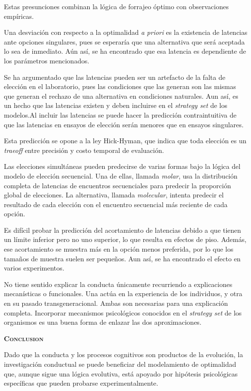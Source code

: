 \documentclass[a4paper,12pt]{article}
\begin{document}
Estas presunciones combinan la lógica de forrajeo óptimo con observaciones empíricas.

Una desviación con respecto a la optimalidad {\itshape a priori} es la existencia de latencias ante opciones singulares, pues se esperaría que una alternativa que será aceptada lo sea de inmediato. Aún así, se ha encontrado que esa latencia es dependiente de los parámetros mencionados.

Se ha argumentado que las latencias pueden ser un artefacto de la falta de elección en el laboratorio, pues las condiciones que las generan son las mismas que generan el rechazo de una alternativa en condiciones naturales. Aun así, es un hecho que las latencias existen y deben incluirse en el {\itshape strategy set} de los modelos.Al incluir las latencias se puede hacer la predicción contraintuitiva de que las latencias en ensayos de elección serán menores que en ensayos singulares.

Esta predicción se opone a la ley Hick-Hyman, que indica que toda elección es un {\itshape traeoff} entre precisión y costo temporal de evaluación.

Las elecciones simultáneas pueden predecirse de varias formas bajo la lógica del modelo de elección secuencial. Una de ellas, llamada {\itshape molar}, usa la distribución completa de latencias de encuentros secuenciales para predecir la proporción global de elecciones. La alternativa, llamada {\itshape molecular}, intenta predecir el resultado de cada elección con el encuentro secuencial más reciente de cada opción.

Es difícil probar la predicción del acortamiento de latencias debido a que tienen un límite inferior pero no uno superior, lo que resulta en efectos de piso. Además, ese acortamiento se muestra más en la opción menos preferida, por lo que los tamaños de muestra suelen ser pequeños. Aun así, se ha encontrado el efecto en varios experimentos.

No tiene sentido explicar la conducta únicamente recurriendo a explicaciones mecanísticas o funcionales. Una actúa en la experiencia de los individuos, y otra en su pasado transgeneracional. Ambas son necesarias para una explicación completa. Incorporar mecanismos psicológicos conocidos en el {\itshape strategy set} de los organismos es una buena forma de enlazar las dos aproximaciones.

{\scshape\bfseries Conclusion}

Dado que la conducta y los procesos cognitivos son productos de la evolución, la investigación conductual se puede beneficiar del modelamiento de optimalidad que, aunque sigue una lógica evolutiva, está apoyado por hipótesis psicológicas específicas que pueden probarse experimentalmente.
\end{document}
